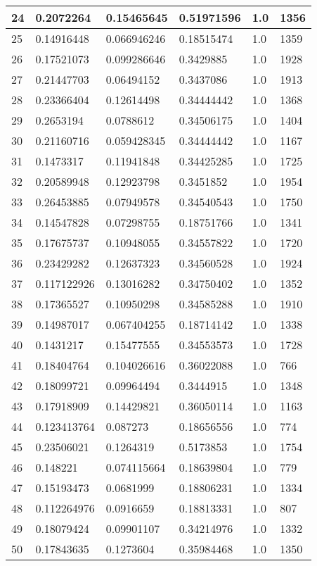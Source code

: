 \begin{longtable}{|l|l|l|l|l|l|}
24 & 0.2072264 & 0.15465645 & 0.51971596 & 1.0 & 1356 \\ \hline 
25 & 0.14916448 & 0.066946246 & 0.18515474 & 1.0 & 1359 \\ \hline 
26 & 0.17521073 & 0.099286646 & 0.3429885 & 1.0 & 1928 \\ \hline 
27 & 0.21447703 & 0.06494152 & 0.3437086 & 1.0 & 1913 \\ \hline 
28 & 0.23366404 & 0.12614498 & 0.34444442 & 1.0 & 1368 \\ \hline 
29 & 0.2653194 & 0.0788612 & 0.34506175 & 1.0 & 1404 \\ \hline 
30 & 0.21160716 & 0.059428345 & 0.34444442 & 1.0 & 1167 \\ \hline 
31 & 0.1473317 & 0.11941848 & 0.34425285 & 1.0 & 1725 \\ \hline 
32 & 0.20589948 & 0.12923798 & 0.3451852 & 1.0 & 1954 \\ \hline 
33 & 0.26453885 & 0.07949578 & 0.34540543 & 1.0 & 1750 \\ \hline 
34 & 0.14547828 & 0.07298755 & 0.18751766 & 1.0 & 1341 \\ \hline 
35 & 0.17675737 & 0.10948055 & 0.34557822 & 1.0 & 1720 \\ \hline 
36 & 0.23429282 & 0.12637323 & 0.34560528 & 1.0 & 1924 \\ \hline 
37 & 0.117122926 & 0.13016282 & 0.34750402 & 1.0 & 1352 \\ \hline 
38 & 0.17365527 & 0.10950298 & 0.34585288 & 1.0 & 1910 \\ \hline 
39 & 0.14987017 & 0.067404255 & 0.18714142 & 1.0 & 1338 \\ \hline 
40 & 0.1431217 & 0.15477555 & 0.34553573 & 1.0 & 1728 \\ \hline 
41 & 0.18404764 & 0.104026616 & 0.36022088 & 1.0 & 766 \\ \hline 
42 & 0.18099721 & 0.09964494 & 0.3444915 & 1.0 & 1348 \\ \hline 
43 & 0.17918909 & 0.14429821 & 0.36050114 & 1.0 & 1163 \\ \hline 
44 & 0.123413764 & 0.087273 & 0.18656556 & 1.0 & 774 \\ \hline 
45 & 0.23506021 & 0.1264319 & 0.5173853 & 1.0 & 1754 \\ \hline 
46 & 0.148221 & 0.074115664 & 0.18639804 & 1.0 & 779 \\ \hline 
47 & 0.15193473 & 0.0681999 & 0.18806231 & 1.0 & 1334 \\ \hline 
48 & 0.112264976 & 0.0916659 & 0.18813331 & 1.0 & 807 \\ \hline 
49 & 0.18079424 & 0.09901107 & 0.34214976 & 1.0 & 1332 \\ \hline 
50 & 0.17843635 & 0.1273604 & 0.35984468 & 1.0 & 1350 \\ \hline 
\end{longtable}